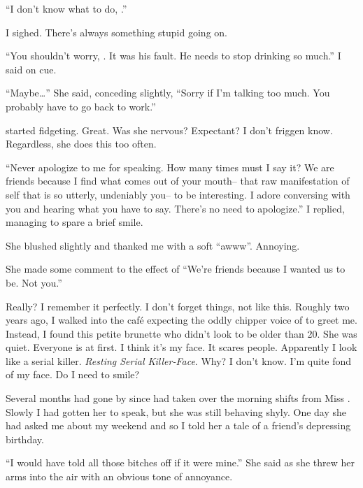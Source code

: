 ``I don't know what to do, \josh.''
\VV


\noindent
I sighed.  There's always something stupid going on.
\VV


``You shouldn't worry, \april.  It was his fault.
He needs to stop drinking so much.'' I said on cue.


``Maybe\ldots{}'' She said, conceding slightly,
``Sorry if I'm talking too much.  You probably have to go back to work.''
\VV


\noindent
\april{} started fidgeting.  Great.  Was she nervous?  Expectant?
I don't friggen know.  Regardless, she does this too often.
\VV


``Never apologize to me for speaking.  How many times must I say it?
We are friends because I find what comes out of your mouth--
that raw manifestation of self that is so utterly, undeniably you--
to be interesting.
I adore conversing with you and hearing what you have to say.
There's no need to apologize.''
I replied, managing to spare a brief smile.
\VV


\noindent
She blushed slightly and thanked me with a soft ``awww''.  Annoying.


\noindent
She made some comment to the effect of
``We're friends because I wanted us to be.  Not you.''


\noindent
Really?  I remember it perfectly.  I don't forget things, not like this.
Roughly two years ago, I walked into the caf\'e expecting the oddly chipper
voice of \emma{} to greet me.  Instead, I found this petite brunette who didn't
look to be older than 20.  She was quiet.  Everyone is at first.
I think it's my face.  It scares people.
Apparently I look like a serial killer.
\textit{Resting Serial Killer-Face}.
Why? I don't know.  I'm quite fond of my face.  Do I need to smile?


Several months had gone by since \april{} had taken over the morning shifts from
Miss \emma.  Slowly I had gotten her to speak, but she was still behaving
shyly.  One day she had asked me about my weekend and so I told her a tale
of a friend's depressing birthday.
\VV


``I would have told all those bitches off if it were mine.''
She said as she threw her arms into the air with an obvious tone of annoyance.
\VV


